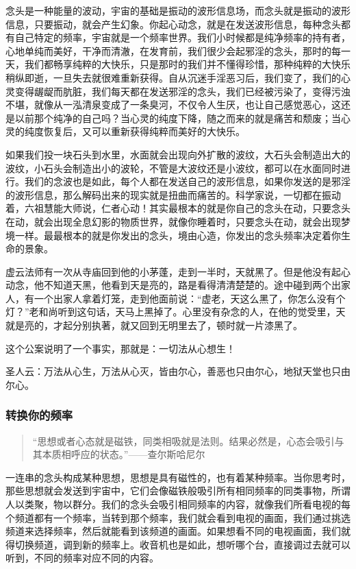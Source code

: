 \documentclass{ctexart}
\begin{document}
念头是一种能量的波动，宇宙的基础是振动的波形信息场，而念头就是振动的波形信息，只要振动，就会产生幻象。你起心动念，就是在发送波形信息，每种念头都有自己特定的频率，宇宙就是一个频率世界。我们小时候都是纯净频率的持有者，心地单纯而美好，干净而清澈，在发育前，我们很少会起邪淫的念头，那时的每一天，我们都畅享纯粹的大快乐，只是那时的我们并不懂得珍惜，那种纯粹的大快乐稍纵即逝，一旦失去就很难重新获得。自从沉迷手淫恶习后，我们变了，我们的心灵变得龌龊而肮脏，我们每天都在发送邪淫的念头，我们已经被污染了，变得污浊不堪，就像从一泓清泉变成了一条臭河，不仅令人生厌，也让自己感觉恶心，这还是以前那个纯净的自己吗？当心灵的纯度下降，随之而来的就是痛苦和颓废；当心灵的纯度恢复后，又可以重新获得纯粹而美好的大快乐。

如果我们投一块石头到水里，水面就会出现向外扩散的波纹，大石头会制造出大的波纹，小石头会制造出小的波轮，不管是大波纹还是小波纹，都可以在水面同时进行。我们的念波也是如此，每个人都在发送自己的波形信息，如果你发送的是邪淫的波形信息，那么解码出来的现实就是扭曲而痛苦的。科学家说，一切都在振动着，六祖慧能大师说，仁者心动！其实最根本的就是你自己的念头在动，只要念头在动，就会出现全息幻影的物质世界，就像你睡着时，只要念头在动，就会出现梦境一样。最最根本的就是你发出的念头，境由心造，你发出的念头频率决定着你生命的景象。

虚云法师有一次从寺庙回到他的小茅蓬，走到一半时，天就黑了。但是他没有起心动念，他不知道天黑，他看到天是亮的，路是看得清清楚楚的。途中碰到两个出家人，有一个出家人拿着灯笼，走到他面前说：“虚老，天这么黑了，你怎么没有个灯？”老和尚听到这句话，天马上黑掉了。心里没有杂念的人，在他的觉受里，天就是亮的，才起分别执著，就又回到无明里去了，顿时就一片漆黑了。

这个公案说明了一个事实，那就是：一切法从心想生！

圣人云：万法从心生，万法从心灭，皆由尔心，善恶也只由尔心，地狱天堂也只由尔心。

\subsubsection{转换你的频率}

\begin{quote}
    “思想或者心态就是磁铁，同类相吸就是法则。结果必然是，心态会吸引与其本质相呼应的状态。”\hfill ——查尔斯哈尼尔
\end{quote}

一连串的念头构成某种思想，思想是具有磁性的，也有着某种频率。当你思考时，那些思想就会发送到宇宙中，它们会像磁铁般吸引所有相同频率的同类事物，所谓人以类聚，物以群分。我们的念头会吸引相同频率的内容，就像我们所看电视的每个频道都有一个频率，当转到那个频率，我们就会看到电视的画面，我们通过挑选频道来选择频率，然后就能看到该频道的画面。如果想看不同的电视画面，我们就得切换频道，调到新的频率上。收音机也是如此，想听哪个台，直接调过去就可以听到，不同的频率对应不同的内容。
\end{document}
